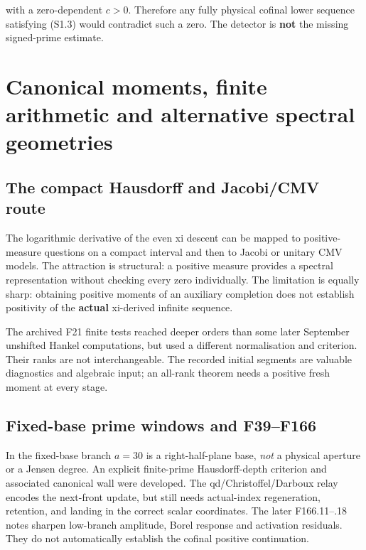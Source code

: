 \documentclass[
  10pt,
  a4paper,
  10pt,
  oneside,
  openany]{book}
\begin{document}
with a zero-dependent \(c>0\). Therefore any fully physical cofinal
lower sequence satisfying (S1.3) would contradict such a zero. The
detector is \textbf{not} the missing signed-prime estimate.

\section{Canonical moments, finite arithmetic and alternative spectral
geometries}\label{canonical-moments-finite-arithmetic-and-alternative-spectral-geometries}

\subsection{The compact Hausdorff and Jacobi/CMV
route}\label{the-compact-hausdorff-and-jacobicmv-route}

The logarithmic derivative of the even xi descent can be mapped to
positive-measure questions on a compact interval and then to Jacobi or
unitary CMV models. The attraction is structural: a positive measure
provides a spectral representation without checking every zero
individually. The limitation is equally sharp: obtaining positive
moments of an auxiliary completion does not establish positivity of the
\textbf{actual} xi-derived infinite sequence.

The archived F21 finite tests reached deeper orders than some later
September unshifted Hankel computations, but used a different
normalisation and criterion. Their ranks are not interchangeable. The
recorded initial segments are valuable diagnostics and algebraic input;
an all-rank theorem needs a positive fresh moment at every stage.

\subsection{Fixed-base prime windows and
F39--F166}\label{fixed-base-prime-windows-and-f39f166}

In the fixed-base branch \(a=30\) is a right-half-plane base, \emph{not}
a physical aperture or a Jensen degree. An explicit finite-prime
Hausdorff-depth criterion and associated canonical wall were developed.
The qd/Christoffel/Darboux relay encodes the next-front update, but
still needs actual-index regeneration, retention, and landing in the
correct scalar coordinates. The later F166.11--.18 notes sharpen
low-branch amplitude, Borel response and activation residuals. They do
not automatically establish the cofinal positive continuation.
\end{document}
